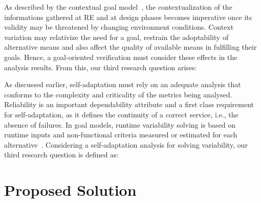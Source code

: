 
As described by the contextual goal model~\cite{Ali:2010}, the contextualization of the informations gathered at RE and at design phases becomes imperative once its validity may be threatened by changing environment conditions. Context variation may relativize the need for a goal, restrain the adoptability of alternative means and also affect the quality of available means in fulfilling their goals. Hence, a goal-oriented verification must consider these effects in the analysis results. From this, our third research question arises:

\bigskip

\noindent{}\bigskip

As discussed earlier, self-adaptation must rely on an adequate analysis that conforms to the complexity and criticality of the metrics being analysed. Reliability is an important dependability attribute and a first class requirement for self-adaptation, as it defines the continuity of a correct service, i.e., the absence of failures. In goal models, runtime variability solving is based on runtime inputs and non-functional criteria measured or estimated for each alternative~\cite{Yu:2008}. Considering a self-adaptation analysis for solving variability, our third research question is defined as:

\bigskip

\setlength{\fboxsep}{10pt}
\noindent{}\bigskip


\section{Proposed Solution} 


